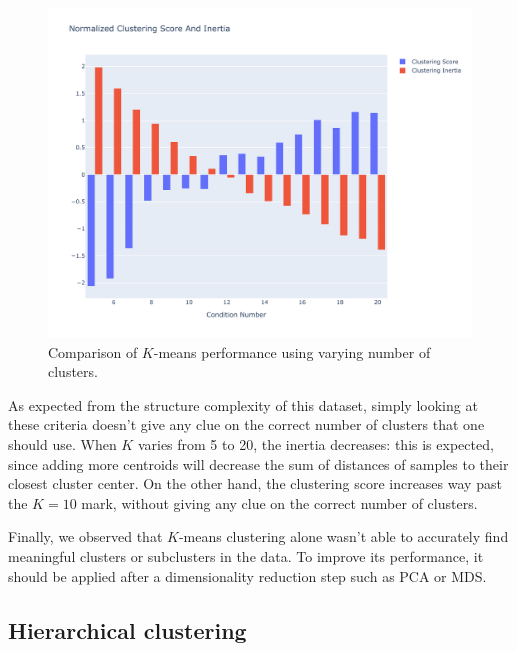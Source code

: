 \documentclass[12pt]{article}
\begin{document}
  \begin{figure}[!ht]
    \centering
    \includegraphics[width=\textwidth]{figures/kmeans2}
    \caption{Comparison of $K$-means performance using varying number of
      clusters.}%
    \label{fig:kmeans2}
  \end{figure} 

  As expected from the structure complexity of this dataset, simply looking at
  these criteria doesn't give any clue on the correct number of clusters that
  one should use. When $K$ varies from 5 to 20, the inertia decreases: this is
  expected, since adding more centroids will decrease the sum of distances of
  samples to their closest cluster center. On the other hand, the clustering
  score increases way past the $K = 10$ mark, without giving any clue on the
  correct number of clusters.

  Finally, we observed that $K$-means clustering alone wasn't able to
  accurately find meaningful clusters or subclusters in the data. To improve
  its performance, it should be applied after a dimensionality reduction step
  such as PCA or MDS\@.

  \subsection{Hierarchical clustering}
\end{document}
